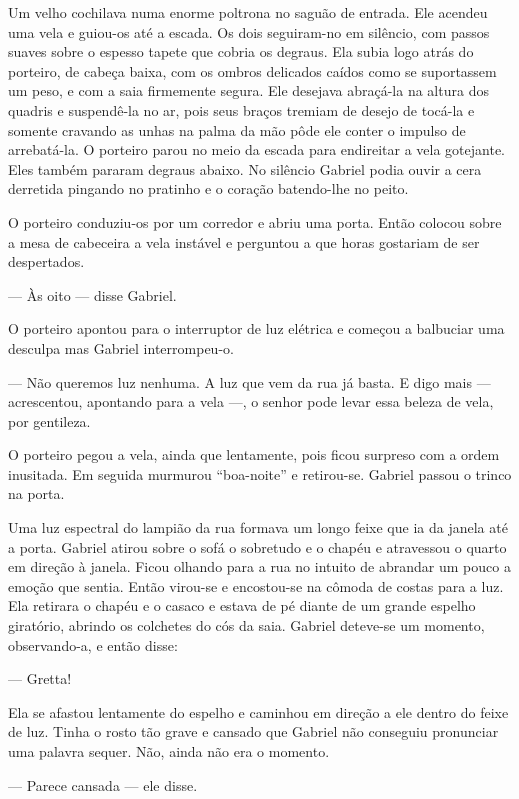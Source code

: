 Um velho cochilava numa enorme poltrona no saguão de entrada.  Ele acendeu uma
vela e guiou-os até a escada.  Os dois seguiram-no em silêncio, com passos
suaves sobre o espesso tapete que cobria os degraus.  Ela subia logo atrás do
porteiro, de cabeça baixa, com os ombros delicados caídos como se suportassem
um peso, e com a saia firmemente segura.  Ele desejava abraçá-la na altura dos
quadris e suspendê-la no ar, pois seus braços tremiam de desejo de tocá-la e
somente cravando as unhas na palma da mão pôde ele conter o impulso de
arrebatá-la.  O porteiro parou no meio da escada para endireitar a vela
gotejante.  Eles também pararam degraus abaixo.  No silêncio Gabriel podia
ouvir a cera derretida pingando no pratinho e o coração batendo-lhe no peito.

O porteiro conduziu-os por um corredor e abriu uma porta.  Então colocou sobre
a mesa de cabeceira a vela instável e perguntou a que horas gostariam de ser
despertados.

--- Às oito --- disse Gabriel.

O porteiro apontou para o interruptor de luz elétrica e começou a balbuciar uma
desculpa mas Gabriel interrompeu-o.

--- Não queremos luz nenhuma.  A luz que vem da rua já basta.  E digo mais ---
acrescentou, apontando para a vela ---, o senhor pode levar essa beleza de
vela, por gentileza.

O porteiro pegou a vela, ainda que lentamente, pois ficou surpreso com a ordem
inusitada.  Em seguida murmurou ``boa-noite'' e retirou-se.  Gabriel passou o
trinco na porta.

Uma luz espectral do lampião da rua formava um longo feixe que ia da janela até
a porta.  Gabriel atirou sobre o sofá o sobretudo e o chapéu e atravessou o
quarto em direção à janela.  Ficou olhando para a rua no intuito de abrandar um
pouco a emoção que sentia.  Então virou-se e encostou-se na cômoda de costas
para a luz.  Ela retirara o chapéu e o casaco e estava de pé diante de um
grande espelho giratório, abrindo os colchetes do cós da saia.  Gabriel
deteve-se um momento, observando-a, e então disse:

--- Gretta!

Ela se afastou lentamente do espelho e caminhou em direção a ele dentro do
feixe de luz.  Tinha o rosto tão grave e cansado que Gabriel não conseguiu
pronunciar uma palavra sequer.  Não, ainda não era o momento.

--- Parece cansada --- ele disse.

